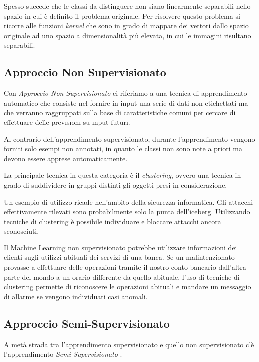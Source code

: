 \documentclass[a4paper,12pt]{report}
\begin{document}
Spesso succede che le classi da distinguere non siano linearmente separabili nello spazio in cui è definito il problema originale. Per risolvere questo problema si ricorre alle funzioni \textit{kernel} che sono in grado di mappare dei vettori dallo spazio originale ad uno spazio a dimensionalità più elevata, in cui le immagini risultano separabili.

\subsection*{Approccio Non Supervisionato}
Con \textit{Approccio Non Supervisionato} \cite{unsupervised_learning} ci riferiamo a una tecnica di apprendimento automatico che consiste nel fornire in input una serie di dati non etichettati ma che verranno raggruppati sulla base di caratteristiche comuni  per cercare di effettuare delle previsioni su input futuri.


Al contrario dell'apprendimento supervisionato, durante l'apprendimento vengono forniti solo esempi non annotati, in quanto le classi non sono note a priori ma devono essere apprese automaticamente.

\bigskip

La principale tecnica in questa categoria è il \textit{clustering}, ovvero una tecnica in grado di suddividere in gruppi distinti  gli oggetti presi in considerazione.

Un esempio di utilizzo ricade nell'ambito della sicurezza informatica. Gli attacchi effettivamente rilevati sono probabilmente solo la punta dell'iceberg. Utilizzando tecniche di clustering è possibile individuare e bloccare attacchi ancora sconosciuti.

Il Machine Learning non supervisionato potrebbe utilizzare informazioni dei clienti sugli utilizzi abituali dei servizi di una banca. Se un malintenzionato provasse a effettuare delle operazioni tramite il nostro conto bancario dall'altra parte del mondo a un orario differente da quello abituale, l'uso di tecniche di clustering permette di riconoscere le operazioni abituali e mandare un messaggio di allarme se vengono individuati casi anomali.

\subsection*{Approccio Semi-Supervisionato}
A metà strada tra l'apprendimento supervisionato e quello non supervisionato c'è l'apprendimento \textit{Semi-Supervisionato} \cite{supervisedlearning}.
\end{document}
